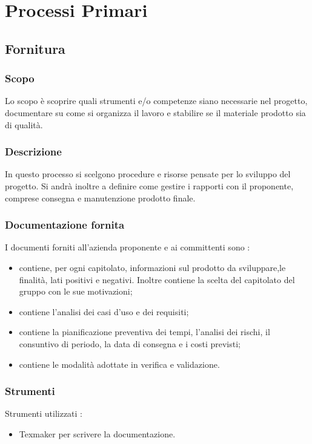 \section{Processi Primari}
\subsection{Fornitura}
\subsubsection{Scopo}
Lo scopo è scoprire quali strumenti e/o competenze siano necessarie nel progetto, documentare su come si organizza il lavoro e stabilire se il materiale prodotto sia di qualità.

\subsubsection{Descrizione}
In questo processo si scelgono procedure e risorse pensate per lo sviluppo del progetto. Si andrà inoltre a definire come gestire i rapporti con il proponente, comprese consegna e manutenzione prodotto finale.

\subsubsection{Documentazione fornita}
I documenti forniti all’azienda proponente e ai committenti sono :
\begin{itemize}
  \item \textbf{\SdF} contiene, per ogni capitolato, informazioni sul prodotto da sviluppare,le finalità, lati positivi e negativi. Inoltre contiene la scelta del capitolato del gruppo con le sue motivazioni;

  \item \textbf{\AdR} contiene l’analisi dei casi d’uso e dei requisiti;

  \item \textbf{\PdP} contiene la pianificazione preventiva dei tempi, l’analisi dei rischi, il consuntivo di periodo, la data di consegna e i costi previsti;

  \item \textbf{\PdQ} contiene le modalità adottate in verifica e validazione.

\end{itemize}
\subsubsection{Strumenti}
Strumenti utilizzati :
\begin{itemize}
  \item Texmaker per scrivere la documentazione.
\end{itemize}

